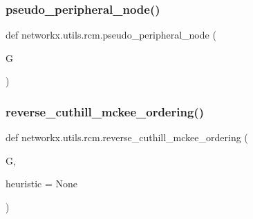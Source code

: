 \subsubsection{\texorpdfstring{pseudo\+\_\+peripheral\+\_\+node()}{pseudo\_peripheral\_node()}}
{\footnotesize\ttfamily def networkx.\+utils.\+rcm.\+pseudo\+\_\+peripheral\+\_\+node (\begin{DoxyParamCaption}\item[{}]{G }\end{DoxyParamCaption})}

\mbox{\label{namespacenetworkx_1_1utils_1_1rcm_a616827ac44a03f97a29f5fe248c14ef0}} 
\subsubsection{\texorpdfstring{reverse\+\_\+cuthill\+\_\+mckee\+\_\+ordering()}{reverse\_cuthill\_mckee\_ordering()}}
{\footnotesize\ttfamily def networkx.\+utils.\+rcm.\+reverse\+\_\+cuthill\+\_\+mckee\+\_\+ordering (\begin{DoxyParamCaption}\item[{}]{G,  }\item[{}]{heuristic = {\ttfamily None} }\end{DoxyParamCaption})}

